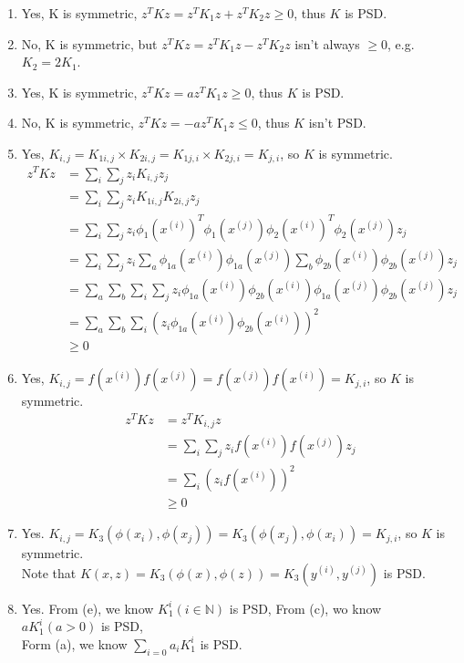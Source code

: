 \begin{answer}
    \begin{enumerate}

        \item Yes, K is symmetric, $z^TKz = z^TK_1z + z^TK_2z \ge 0$, thus $K$ is PSD. 
        \item No, K is symmetric, but $z^TKz = z^TK_1z - z^TK_2z$ isn't always $\ge0$, e.g. $K_2 = 2K_1$. 
        \item Yes, K is symmetric, $z^TKz = az^TK_1z \ge 0$, thus $K$ is PSD. 
        \item No, K is symmetric, $z^TKz = -az^TK_1z \le 0$, thus $K$ isn't PSD. 
        \item Yes, $K_{i, j} = K_{1 i, j} \times K_{2i, j} = K_{1 j, i} \times K_{2j, i} = K_{j, i}$, so $K$ is symmetric.
                $$
                \begin{aligned}
                    z^TKz &= \sum_i \sum_j z_iK_{i, j}z_j\\
                    &= \sum_i \sum_j z_i K_{1 i, j}K_{2i, j}z_j \\
                    &= \sum_i \sum_j z_i \phi_1(x^{(i)})^T\phi_1(x^{(j)}) \phi_2(x^{(i)})^T\phi_2(x^{(j)})z_j\\
                    &= \sum_i \sum_j z_i \sum_a \phi_{1a}(x^{(i)})\phi_{1a}(x^{(j)}) \sum_b \phi_{2b}(x^{(i)}) \phi_{2b}(x^{(j)}) z_j \\
                    &= \sum_a\sum_b\sum_i\sum_j z_i \phi_{1a}(x^{(i)}) \phi_{2b}(x^{(i)}) \phi_{1a}(x^{(j)}) \phi_{2b}(x^{(j)}) z_j\\
                    &= \sum_a\sum_b\sum_i\left(z_i \phi_{1a}(x^{(i)}) \phi_{2b}(x^{(i)})\right)^2\\
                    &\ge 0
                \end{aligned}
                $$
        \item Yes, $K_{i, j} = f(x^{(i)})f(x^{(j)}) = f(x^{(j)})f(x^{(i)}) = K_{j, i}$, so $K$ is symmetric.
        $$
        \begin{aligned}
            z^TKz &= z^TK_{i, j}z\\
            &= \sum_i \sum_j z_if(x^{(i)})f(x^{(j)})z_j\\
            &= \sum_i \left(z_if(x^{(i)})\right)^2\\
            &\ge 0
        \end{aligned}
        $$
        \item Yes. $K_{i, j} = K_3(\phi(x_i), \phi(x_j)) = K_3(\phi(x_j), \phi(x_i)) = K_{j, i}$, so $K$ is symmetric. \\
        Note that $K(x,z) = K_3(\phi(x),\phi(z)) = K_3(y^{(i)}, y^{(j)})$ is PSD.
        \item Yes. From (e), we know $K_1^i(i \in \mathbb{N})$ is PSD, From (c), wo know $aK_1^i(a > 0)$ is PSD,\\ 
        Form (a), we know $\sum_{i = 0} a_i K_1^i$ is PSD.
        
    \end{enumerate}
\end{answer}